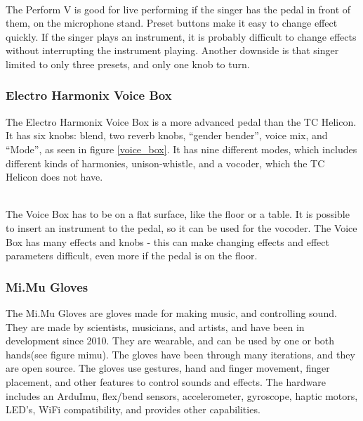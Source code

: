 \begin{minipage}{\linewidth}%
\label{tchelicon}
\end{minipage}\\

The Perform V is good for live performing if the singer has the pedal in front of them, on the microphone stand. Preset buttons make it easy to change effect quickly. 
If the singer plays an instrument, it is probably difficult to change effects without interrupting the instrument playing. Another downside is that singer limited to only three presets, and only one knob to turn.

\subsubsection{Electro Harmonix Voice Box}

The Electro Harmonix Voice Box is a more advanced pedal than the TC Helicon\citep{VoiceBox}. It has six knobs: blend, two reverb knobs, “gender bender”, voice mix, and “Mode”, as seen in figure \ref{voice_box}. It has nine different modes, which includes different kinds of harmonies, unison-whistle, and a vocoder, which the TC Helicon does not have.\\

\begin{minipage}{\linewidth}%
\label{voice_box}
\end{minipage}\\

The Voice Box has to be on a flat surface, like the floor or a table. It is possible to insert an instrument to the pedal, so it can be used for the vocoder. The Voice Box has many effects and knobs - this can make changing effects and effect parameters difficult, even more if the pedal is on the floor.

\subsubsection{Mi.Mu Gloves}

The Mi.Mu Gloves are gloves made for making music, and controlling sound\citep{Mimu}. They are made by scientists, musicians, and artists, and have been in development since 2010. They are wearable, and can be used by one or both hands(see figure mimu). The gloves have been through many iterations, and they are open source. The gloves use gestures, hand and finger movement, finger placement, and other features to control sounds and effects. The hardware includes an ArduImu, flex/bend sensors, accelerometer, gyroscope, haptic motors, LED's, WiFi compatibility, and provides other capabilities.\\

